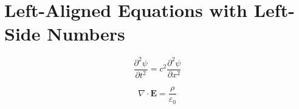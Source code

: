 \documentclass[fleqn,leqno]{article}
\begin{document}
\section*{Left-Aligned Equations with Left-Side Numbers}

\begin{equation}
\frac{\partial^2 \psi}{\partial t^2} = c^2 \frac{\partial^2 \psi}{\partial x^2}
\end{equation}

\begin{equation}
\nabla \cdot \mathbf{E} = \frac{\rho}{\varepsilon_0}
\end{equation}
\end{document}
